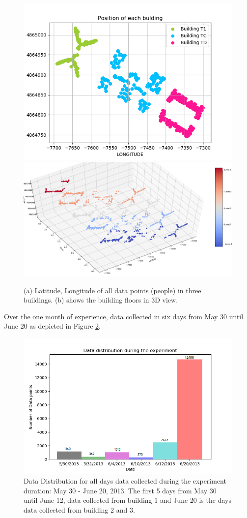 \begin{figure}[!h]
    \centering
    \includegraphics[width = 7 cm]{image/Chapters/Chapter6/LatLong.png}\hfill
    \includegraphics[width = 8 cm]{image/Chapters/Chapter6/LatLongFloor.png}
    \\[\smallskipamount]    
    \caption{(a) Latitude, Longitude of all data points (people) in three buildings. (b) shows the building floors in 3D view.}
    \label{nama}
\end{figure}


Over the one month of experience, data collected in six days from May 30 until June 20 as depicted in Figure \ref{timeline}. 



\begin{figure}
    \centering
    \includegraphics[width = 12 cm]{image/Chapters/Chapter6/timedist.png}
    \caption{Data Distribution for all days data collected during the experiment duration: May 30 - June 20, 2013. The first 5  days from May 30 until June 12, data collected from building 1 and June 20 is the days data collected from building 2 and 3.}
    \label{timeline}
\end{figure}





